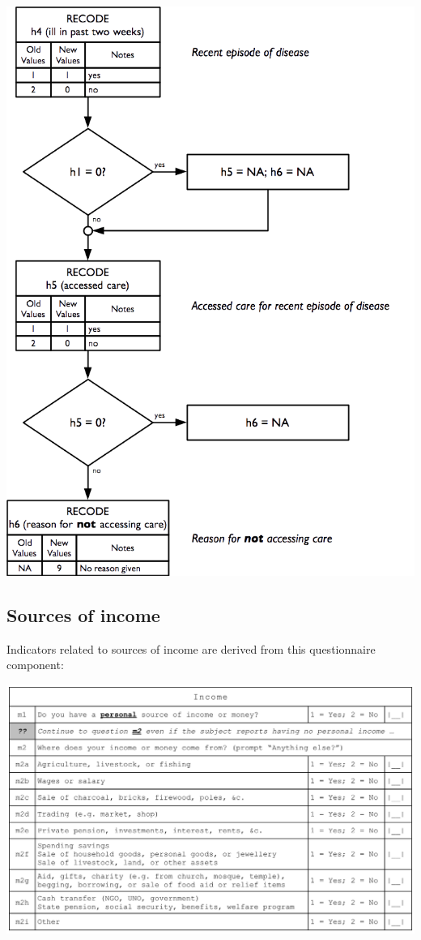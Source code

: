 \documentclass[12pt,a4paper]{book}
\theoremstyle{definition}
\theoremstyle{definition}
\theoremstyle{definition}
\theoremstyle{remark}
\begin{document}
\begin{center}\includegraphics[width=9.76in]{figures/indicators22} \end{center}

\hypertarget{sources-of-income}{%
\subsection{Sources of income}\label{sources-of-income}}

Indicators related to sources of income are derived from this
questionnaire component:

\begin{center}\includegraphics[width=23.93in]{figures/questionnaire09} \end{center}
\end{document}
